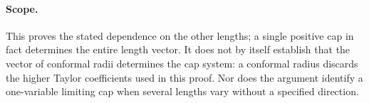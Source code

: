 \paragraph{Scope.}
This proves the stated dependence on the other lengths; a single
positive cap in fact determines the entire length vector. It does
not by itself establish that
the vector of conformal radii determines the cap system: a conformal
radius discards the higher Taylor coefficients used in this proof.
Nor does the argument identify a one-variable limiting cap when several
lengths vary without a specified direction.
